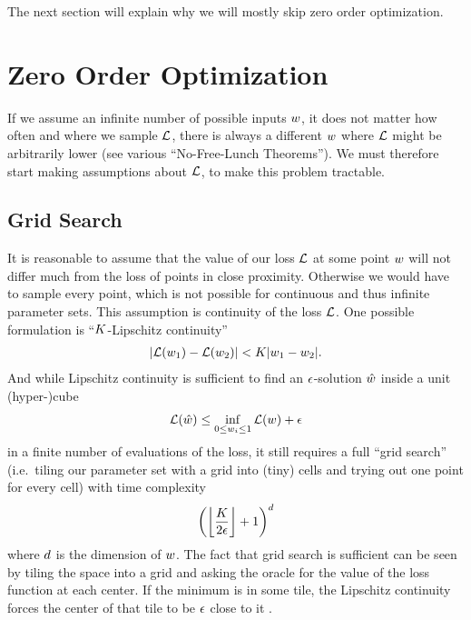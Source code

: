 The next section will explain why we will mostly skip zero order
optimization.

\section{Zero Order Optimization}

If we assume an infinite number of possible inputs \(w\), it does not matter
how often and where we sample \(\mathcal{L}\), there is always a different \(w\) where
\(\mathcal{L}\) might be arbitrarily lower (see various ``No-Free-Lunch Theorems'').
We must therefore start making assumptions about \(\mathcal{L}\), to make this
problem tractable.

\subsection{Grid Search}

It is reasonable to assume that the value of our loss \(\mathcal{L}\) at some point
\(w\) will not differ much from the loss of points in close proximity.
Otherwise we would have to sample every point, which is not possible for continuous
and thus infinite parameter sets. This assumption is continuity of the loss
\(\mathcal{L}\). One possible formulation is ``\(K\)-Lipschitz continuity''
%
\begin{align*}
	| \mathcal{L}(w_1) - \mathcal{L}(w_2) | < K | w_1 - w_2 |.
\end{align*}
%
And while Lipschitz continuity is sufficient to find an \(\epsilon\)-solution
\(\hat{w}\) inside a unit (hyper-)cube
%
\begin{align*}
	\mathcal{L}(\hat{w}) \le \inf_{ 0\le w_i\le 1} \mathcal{L}(w) + \epsilon
\end{align*}
%
in a finite number of evaluations of the loss, it still requires a full
``grid search'' (i.e.\ tiling our parameter set with a grid into (tiny) cells
and trying out one point for every cell) with time complexity \parencite[pp.
12,13]{nesterovLecturesConvexOptimization2018}
%
\begin{align*}
	\left(\left\lfloor \frac{K}{2\epsilon}\right\rfloor + 1\right)^d
\end{align*}
%
where \(d\) is the dimension of \(w\). The fact that grid search is
sufficient can be seen by tiling the space into a grid and asking the oracle
for the value of the loss function at each center. If the minimum is in
some tile, the Lipschitz continuity forces the center of that tile to be \(\epsilon\)
close to it \parencite[cf.][p. 11]{nesterovLecturesConvexOptimization2018}.

